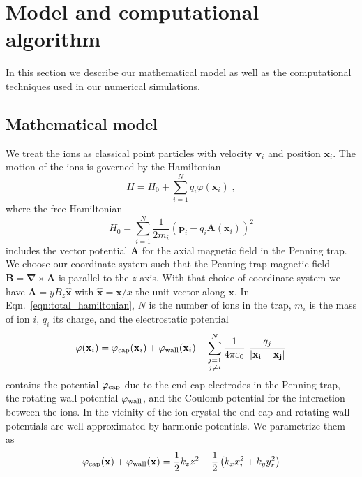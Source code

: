 \documentclass[aps, pra, twocolumn]{revtex4-1}
\newcommand{\hzero}{H_0}
\newcommand{\phicap}{\varphi_{\rm cap}}
\newcommand{\phiwall}{\varphi_{\rm wall}}
\begin{document}
\section{Model and computational algorithm}
\label{sec:model}

In this section we describe our mathematical model as well as the
computational techniques used in our numerical simulations.


\subsection{Mathematical model}

We treat the ions as classical point particles with 
velocity $\mathbf{v}_i$ and position $\mathbf{x}_i$. The motion
of the ions is governed by the Hamiltonian
\begin{equation}
  H = \hzero + \sum_{i=1}^N q_i\varphi(\mathbf{x}_i)\;,
\end{equation}
where the free Hamiltonian
\begin{equation}
  \hzero =
  \sum_{i=1}^N \frac{1}{2m_i}\left(
    \mathbf{p}_i -
    q_i\mathbf{A}(\mathbf{x}_i) \right)^2 
  \label{eqn:total_hamiltonian}
\end{equation}
includes the vector potential $\mathbf{A}$ for the axial magnetic
field in the Penning trap. We choose our coordinate system such
that the Penning trap magnetic field $\mathbf{B} =
\mathbf{\nabla}\times \mathbf{A}$ is parallel to the $z$ axis.
With that choice of coordinate system we have $\mathbf{A} =
yB_z\mathbf{\hat x}$ with $\mathbf{\hat x}=\mathbf{x}/x$ the unit
vector along $\mathbf{x}$. In Eqn.~\eqref{eqn:total_hamiltonian},
$N$ is the number of ions in the trap, $m_i$ is the mass of ion
$i$, $q_i$ its charge, and the electrostatic potential
\begin{equation}
  \varphi(\mathbf{x}_i) =
  \phicap(\mathbf{x}_i) +
  \phiwall(\mathbf{x}_i) +
  \sum_{\substack{j=1\\j\neq i}}^N
  \frac{1}{4\pi\varepsilon_0}\
  \frac{q_j}{\left| \mathbf{x_i} - \mathbf{x_j} \right|}
\end{equation}
contains the potential $\phicap$ due to the end-cap electrodes in
the Penning trap, the rotating wall potential $\phiwall$, and the
Coulomb potential for the interaction between the ions. In the
vicinity of the ion crystal the end-cap and rotating wall
potentials are well approximated by harmonic potentials. We
parametrize them as
\begin{equation}
  \phicap(\mathbf{x}) +\phiwall(\mathbf{x}) =\frac{1}{2}k_z z^2 - 
\frac{1}{2} \left(k_x x_r^2 + k_y y_r^2\right)
\end{equation}
\end{document}
